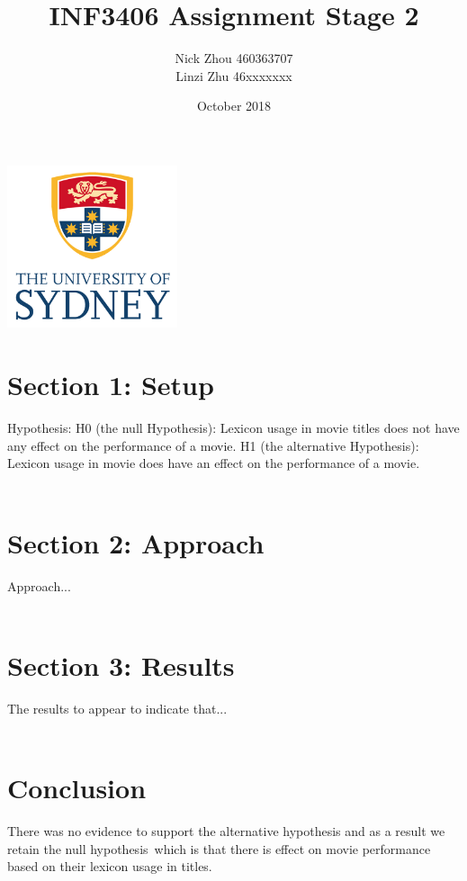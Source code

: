 \documentclass[font=10pt]{article}
\begin{document}
  \begin{titlepage}
      \centering
      \title{INF3406 Assignment Stage 2}
      \author{
        Nick Zhou 460363707\\
        Linzi Zhu 46xxxxxxx
      }
      \date{October 2018}
      \maketitle
      \includegraphics[width=5cm]{usyd}
  \end{titlepage}

  \section{Section 1: Setup}
  Hypothesis:
  H0 (the null Hypothesis): Lexicon usage in movie titles does not have any effect on the performance of a movie.
  H1 (the alternative Hypothesis): Lexicon usage in movie does have an effect on the performance of a movie.
  \\\\
  \section{Section 2: Approach}
  Approach...
  \\\\
  \section{Section 3: Results}
  The results to appear to indicate that...
  \\\\
  \section{Conclusion}
  There was no evidence to support the alternative hypothesis and as a result we retain the null hypothesis\
  which is that there is effect on movie performance based on their lexicon usage in titles.
\end{document}
